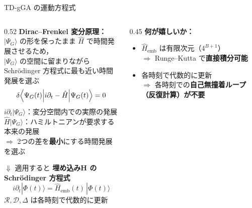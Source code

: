 \documentclass[12pt,aspectratio=169]{beamer}
\begin{document}
\begin{frame}[shrink=18]{TD-gGA の運動方程式}
  \begin{columns}[T]
    \begin{column}{0.52\textwidth}
      \textbf{Dirac--Frenkel 変分原理：}\\
      {\small $|\Psi_G\rangle$ の形を保ったまま $\hat{H}$ で時間発展させるため，\\
      $|\Psi_G\rangle$ の空間に留まりながら\\
      Schrödinger 方程式に最も近い時間発展を選ぶ}
      \begin{equation*}
        \delta\Bigl\langle\Psi_G(t)\Big|i\partial_t-\hat{H}\Big|\Psi_G(t)\Bigr\rangle=0
      \end{equation*}
      {\scriptsize
        $i\partial_t|\Psi_G\rangle$：変分空間内での実際の発展\\
        $\hat{H}|\Psi_G\rangle$：ハミルトニアンが要求する本来の発展\\
        $\Rightarrow$ 2つの差を\textbf{最小}にする時間発展を選ぶ
      }

      \begin{block}{$\Downarrow$ 適用すると}
        \centering
        \textbf{埋め込みH の Schrödinger 方程式}
        \begin{equation*}
          i\partial_t|\Phi(t)\rangle = \hat{H}_\mathrm{emb}(t)\,|\Phi(t)\rangle
        \end{equation*}
        {\small $\mathcal{R},\mathcal{D},\Delta$ は各時刻で代数的に更新}
      \end{block}
    \end{column}

    \begin{column}{0.45\textwidth}
      \textbf{何が嬉しいか：}
      \begin{itemize}
        \item $\hat{H}_\mathrm{emb}$ は有限次元（$4^{B+1}$）\\
          $\Rightarrow$ Runge--Kutta で\textbf{直接積分可能}
        \item 各時刻で代数的に更新\\
          $\Rightarrow$ 各時刻での\textbf{自己無撞着ループ（反復計算）が不要}
      \end{itemize}


\end{column}
\end{columns}
\end{frame}
\end{document}
